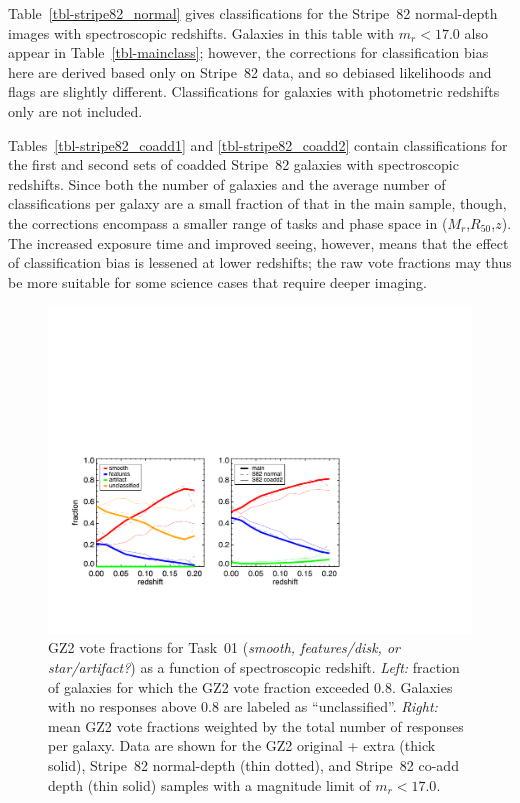 \documentclass[useAMS,usenatbib]{mn2e}
\newcommand{\mr}{$M_r$}
\newcommand{\rfifty}{$R_{50}$}
\newcommand{\redshift}{$z$}
\begin{document}
Table~\ref{tbl-stripe82_normal} gives classifications for the Stripe~82 normal-depth images with spectroscopic redshifts. Galaxies in this table with $m_r < 17.0$ also appear in Table~\ref{tbl-mainclass}; however, the corrections for classification bias here are derived based only on Stripe~82 data, and so debiased likelihoods and flags are slightly different. Classifications for galaxies with photometric redshifts only are not included.

Tables~\ref{tbl-stripe82_coadd1} and \ref{tbl-stripe82_coadd2} contain classifications for the first and second sets of coadded Stripe~82 galaxies with spectroscopic redshifts. Since both the number of galaxies and the average number of classifications per galaxy are a small fraction of that in the main sample, though, the corrections encompass a smaller range of tasks and phase space in (\mr,\rfifty,\redshift). The increased exposure time and improved seeing, however, means that the effect of classification bias is lessened at lower redshifts; the raw vote fractions may thus be more suitable for some science cases that require deeper imaging. 

\begin{figure}
\includegraphics[angle=0,width=7.0in]{figures/gz2_bias_demo_task01.pdf}
\caption{GZ2 vote fractions for Task~01 ({\it smooth, features/disk, or star/artifact?}) as a function of spectroscopic redshift. {\it Left:} fraction of galaxies for which the GZ2 vote fraction exceeded 0.8. Galaxies with no responses above 0.8 are labeled as ``unclassified''. {\it Right:} mean GZ2 vote fractions weighted by the total number of responses per galaxy. Data are shown for the GZ2 original + extra (thick solid), Stripe~82 normal-depth (thin dotted), and Stripe~82 co-add depth (thin solid) samples with a magnitude limit of $m_r < 17.0$.
\label{fig-task01}}
\end{figure}
\end{document}
